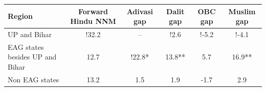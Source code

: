 \begin{tabular}{lccccc}
\hline
Region & Forward Hindu NNM & Adivasi gap & Dalit gap & OBC gap & Muslim gap \\
\hline
UP and Bihar&!32.2&--&!2.6&!-5.2&!-4.1\\
EAG states besides UP and Bihar&12.7&!22.8*&13.8**&5.7&16.9**\\
Non EAG states&13.2&1.5&1.9&-1.7&2.9\\
\hline
\end{tabular}
